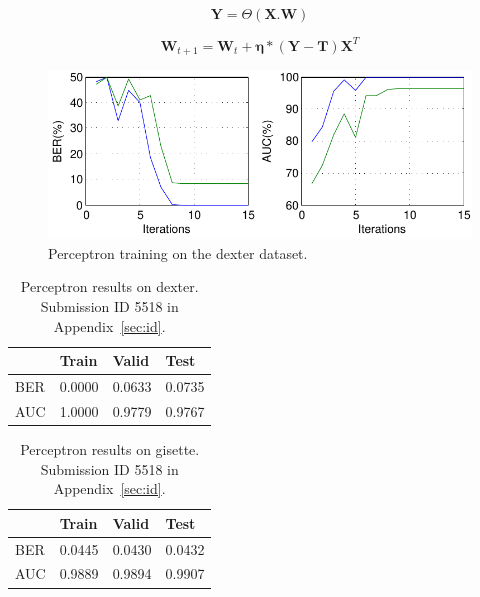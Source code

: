 \documentclass{ecsarticle}     %
\begin{document}
\begin{equation}
   \textbf{Y} = \Theta ( \textbf{X}.\textbf{W})
   \label{eqn:slp_mat}
\end{equation}

\begin{equation}	
	\textbf{W}_{t+1} = \textbf{W}_t + \mathbf{\eta}*(\mathbf{Y}-\mathbf{T})\mathbf{X}^T
	\label{eqn:slp_learn}
\end{equation}


\begin{figure}[ht]
   \centering
    \includegraphics[width = 12cm]{SLP_train.pdf}
   \caption{Perceptron training on the dexter dataset.}
   \label{fig:slp_train}
\end{figure}


\begin{table}[h]
	\centering
	\begin{tabular}{|l|l|l|l|} \hline
     			& Train & Valid & Test \\ \hline
		BER & 0.0000 & 0.0633 & 0.0735 \\ \hline
		AUC & 1.0000 & 0.9779 & 0.9767 \\ \hline
	\end{tabular}
	\caption{Perceptron results on dexter. Submission ID 5518 in Appendix~\ref{sec:id}.}
	\label{tab:slp_dexter}
\end{table}

\begin{table}[h]
	\centering
	\begin{tabular}{|l|l|l|l|} \hline
     			& Train & Valid & Test \\ \hline
		BER & 0.0445 & 0.0430 & 0.0432 \\ \hline
		AUC & 0.9889 & 0.9894 & 0.9907 \\ \hline
	\end{tabular}
	\caption{Perceptron results on gisette. Submission ID 5518 in Appendix~\ref{sec:id}.}
	\label{tab:slp_gisette}
\end{table}
\end{document}
